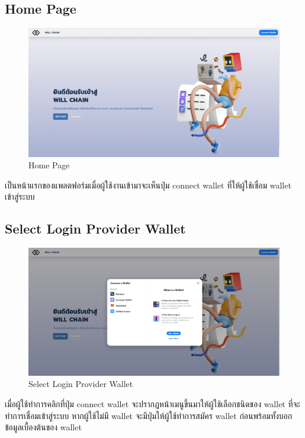 \documentclass[12pt,oneside,openright,a4paper]{cpe-thai-project}
\begin{document}
\subsection{Home Page}
	\begin{figure}[!thb]
			\centering
			\includegraphics[scale=0.2]{homePageBefore4}
			\caption{Home Page}
		\end{figure}
		\FloatBarrier
\tab เป็นหน้าแรกของแพลตฟอร์มเมื่อผู้ใช้งานเข้ามาจะเห็นปุ่ม connect wallet ที่ให้ผู้ใช้เชื่อม wallet เข้าสู่ระบบ
\subsection{Select Login Provider Wallet}
	\begin{figure}[!thb]
			\centering
			\includegraphics[scale=0.2]{homePageSelect4}
			\caption{Select Login Provider Wallet}
		\end{figure}
		\FloatBarrier
\tab เมื่อผู้ใช้ทำการคลิกที่ปุ่ม connect wallet จะปรากฎหน้าเมนูขึ้นมาให้ผู้ใช้เลือกชนิดของ wallet ที่จะทำการเชื่อมเข้าสู่ระบบ หากผู้ใช้ไม่มี wallet จะมีปุ่มให้ผู้ใช้ทำการสมัคร wallet ก่อนพร้อมทั้งบอกข้อมูลเบื้องต้นของ wallet
\end{document}
